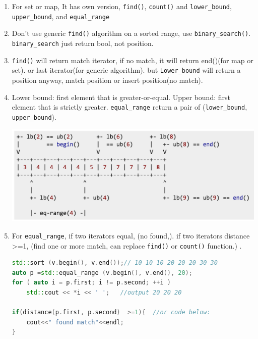 \documentclass[a4paper,11pt,twoside]{book}
\begin{document}
\begin{itemize}
\begin{enumerate}
	\item For set or map, It has own version, \texttt{find()}, \texttt{count()} and \texttt{lower\_bound}, \texttt{upper\_bound}, and \texttt{equal\_range}
	
	\item Don't use generic \texttt{find()} algorithm on a sorted range,  use \texttt{binary\_search()}. \texttt{binary\_search} just return bool, not position.
	
	\item  \texttt{find()} will return match iterator, if no match, it will return end()(for map or set). or last iterator(for generic algorithm). but \texttt{Lower\_bound}  will return a position anyway, match position or insert position(no match).
	
	\item Lower bound: first element that is greater-or-equal. Upper bound: first element that is strictly greater. \texttt{equal\_range} return a pair of (\texttt{lower\_bound}, \texttt{upper\_bound}).
	
	\begin{center}
		\includegraphics[scale=0.5]{pics/lowerupper.png}
	\end{center}
	
	
	\item For \texttt{equal\_range}, if two iterators equal, (no found,). if two iterators distance >=1, (find one or more match, can replace \texttt{find()} or \texttt{count()} function.) .
\begin{lstlisting}[frame=single, language=c++]
std::sort (v.begin(), v.end());// 10 10 10 20 20 20 30 30
auto p =std::equal_range (v.begin(), v.end(), 20);
for ( auto i = p.first; i != p.second; ++i )
	std::cout << *i << ' ';   //output 20 20 20

if(distance(p.first, p.second)  >=1){  //or code below:
	cout<<" found match"<<endl;
}	
\end{lstlisting}	
	
	\end{enumerate}
\end{itemize}
\end{document}
